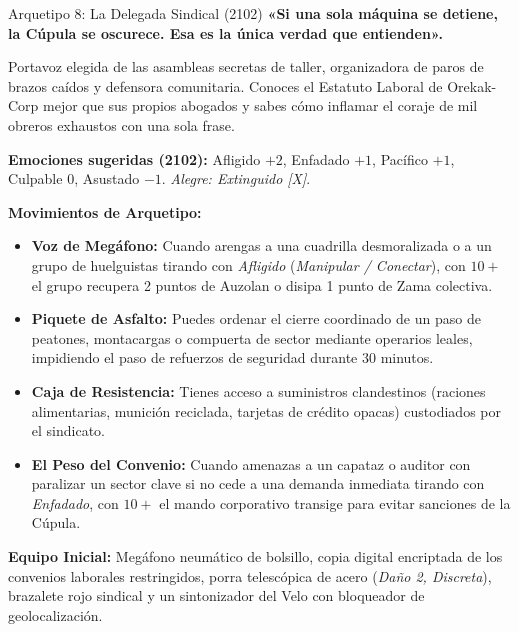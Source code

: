 \begin{FichaArquetipo}{Arquetipo 8: La Delegada Sindical (2102)}
\textbf{«Si una sola máquina se detiene, la Cúpula se oscurece. Esa es la única verdad que entienden».}

Portavoz elegida de las asambleas secretas de taller, organizadora de paros de brazos caídos y defensora comunitaria. Conoces el Estatuto Laboral de Orekak-Corp mejor que sus propios abogados y sabes cómo inflamar el coraje de mil obreros exhaustos con una sola frase.

\textbf{Emociones sugeridas (2102):} Afligido $+2$, Enfadado $+1$, Pacífico $+1$, Culpable $0$, Asustado $-1$. \textit{Alegre: Extinguido [X]}.

\textbf{Movimientos de Arquetipo:}
\begin{itemize}
    \item \textbf{Voz de Megáfono:} Cuando arengas a una cuadrilla desmoralizada o a un grupo de huelguistas tirando con \textit{Afligido} (\textit{Manipular / Conectar}), con $10+$ el grupo recupera 2 puntos de Auzolan o disipa 1 punto de Zama colectiva.
    \item \textbf{Piquete de Asfalto:} Puedes ordenar el cierre coordinado de un paso de peatones, montacargas o compuerta de sector mediante operarios leales, impidiendo el paso de refuerzos de seguridad durante 30 minutos.
    \item \textbf{Caja de Resistencia:} Tienes acceso a suministros clandestinos (raciones alimentarias, munición reciclada, tarjetas de crédito opacas) custodiados por el sindicato.
    \item \textbf{El Peso del Convenio:} Cuando amenazas a un capataz o auditor con paralizar un sector clave si no cede a una demanda inmediata tirando con \textit{Enfadado}, con $10+$ el mando corporativo transige para evitar sanciones de la Cúpula.
\end{itemize}

\textbf{Equipo Inicial:} Megáfono neumático de bolsillo, copia digital encriptada de los convenios laborales restringidos, porra telescópica de acero (\textit{Daño 2, Discreta}), brazalete rojo sindical y un sintonizador del Velo con bloqueador de geolocalización.
\end{FichaArquetipo}

\vspace{1em}

